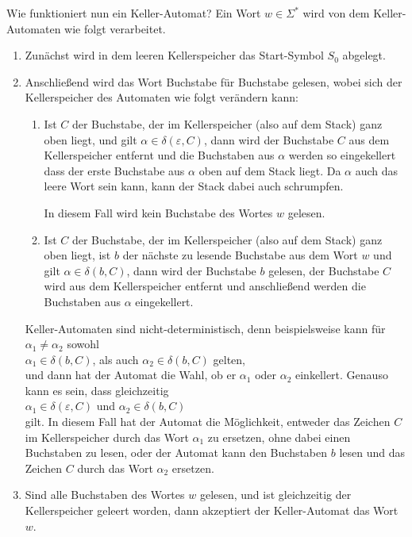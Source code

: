 Wie funktioniert nun ein Keller-Automat?  Ein Wort $w \in \Sigma^*$ wird von dem
Keller-Automaten wie folgt verarbeitet. 
\begin{enumerate}
\item Zun\"achst wird in dem leeren Kellerspeicher das Start-Symbol $S_0$ abgelegt.
\item Anschlie{\ss}end wird das Wort Buchstabe f\"ur Buchstabe gelesen, wobei sich der 
      Kellerspeicher des Automaten wie folgt ver\"andern kann:
      \begin{enumerate}
      \item Ist $C$ der Buchstabe, der im Kellerspeicher (also auf dem Stack) ganz oben liegt, 
            und gilt $\alpha \in \delta(\varepsilon, C)$, dann wird der Buchstabe $C$ 
            aus dem Kellerspeicher entfernt und die Buchstaben aus $\alpha$ werden so eingekellert
            dass der erste Buchstabe aus $\alpha$  oben auf dem Stack liegt.
            Da $\alpha$ auch das leere Wort sein kann, kann der Stack dabei auch schrumpfen.

            In diesem Fall wird kein Buchstabe des Wortes $w$ gelesen.
      \item Ist $C$ der Buchstabe, der im Kellerspeicher (also auf dem Stack) ganz oben liegt, ist
            $b$ der n\"achste zu lesende Buchstabe aus dem Wort $w$ und gilt
            $\alpha \in \delta(b, C)$, dann wird der Buchstabe $b$ gelesen, der Buchstabe
            $C$ wird aus dem Kellerspeicher entfernt und anschlie{\ss}end werden die Buchstaben aus
            $\alpha$ eingekellert. 
      \end{enumerate}
      Keller-Automaten sind nicht-deterministisch, denn beispielsweise kann f\"ur       
      $\alpha_1 \not= \alpha_2$ sowohl 
      \\[0.2cm]
      \hspace*{1.3cm}
      $\alpha_1 \in \delta(b,C)$, \quad als auch \quad $\alpha_2 \in \delta(b,C)$ gelten,
      \\[0.2cm]
      und dann hat der Automat die Wahl, ob er $\alpha_1$ oder $\alpha_2$ einkellert.
      Genauso kann es sein, dass gleichzeitig
      \\[0.2cm]
      \hspace*{1.3cm}
      $\alpha_1 \in \delta(\varepsilon,C)$ \quad und \quad $\alpha_2 \in \delta(b,C)$
      \\[0.2cm]
      gilt.  In diesem Fall hat der Automat die M\"oglichkeit, entweder das Zeichen
      $C$ im Kellerspeicher durch das Wort $\alpha_1$ zu ersetzen, ohne dabei einen Buchstaben zu lesen, oder
      der Automat kann den Buchstaben $b$ lesen und das Zeichen $C$ durch das Wort $\alpha_2$
      ersetzen.
\item Sind alle Buchstaben des Wortes $w$ gelesen, und ist gleichzeitig der Kellerspeicher geleert worden,
      dann akzeptiert der Keller-Automat das Wort $w$.
\end{enumerate}
